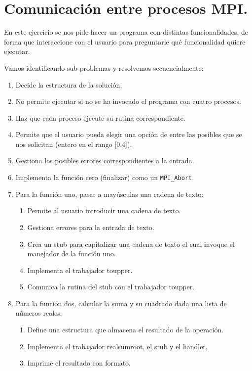 \section{Comunicación entre procesos MPI.}
En este ejercicio se nos pide hacer un programa con distintas funcionalidades,
de forma que interaccione con el usuario para preguntarle qué funcionalidad quiere
ejecutar.

Vamos identificando sub-problemas y resolvemos secuencialmente:
\begin{enumerate}
    \item Decide la estructura de la solución.
    \item No permite ejecutar si no se ha invocado el programa con cuatro procesos.
    \item Haz que cada proceso ejecute su rutina correspondiente.
    \item Permite que el usuario pueda elegir una opción de entre las posibles que se nos solicitan (entero en el rango [0,4]).
    \item Gestiona los posibles errores correspondientes a la entrada.
    \item Implementa la función cero (finalizar) como un \texttt{MPI\_Abort}.
    \item Para la función uno, pasar a mayúsculas una cadena de texto:
    \begin{enumerate}
        \item Permite al usuario introducir una cadena de texto.
        \item Gestiona errores para la entrada de texto.
        \item Crea un stub para capitalizar una cadena de texto el cual invoque el manejador de la función uno.
        \item Implementa el trabajador toupper.
        \item Comunica la rutina del stub con el trabajador toupper.
    \end{enumerate}
    \item Para la función dos, calcular la suma y su cuadrado dada una lista de números reales:
    \begin{enumerate}
        \item Define una estructura que almacena el resultado de la operación.
        \item Implementa el trabajador realsumroot, el stub y el handler.
        \item Imprime el resultado con formato.
    \end{enumerate}

\end{enumerate}
